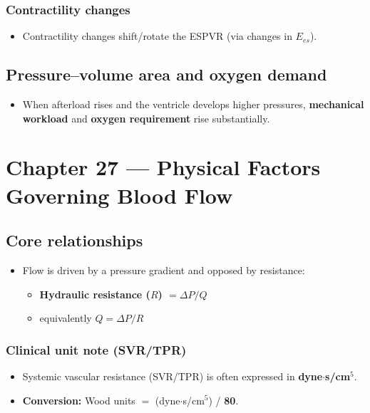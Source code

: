 \documentclass[11pt,a4paper]{article}
\begin{document}
\subsubsection{Contractility changes}
\begin{itemize}
\item Contractility changes shift/rotate the ESPVR (via changes in $E_{es}$).
\end{itemize}

\subsection{Pressure--volume area and oxygen demand}
\begin{itemize}
\item When afterload rises and the ventricle develops higher pressures, \textbf{mechanical workload} and \textbf{oxygen requirement} rise substantially.
\end{itemize}


\section{Chapter 27 --- Physical Factors Governing Blood Flow}

\subsection{Core relationships}
\begin{itemize}
\item Flow is driven by a pressure gradient and opposed by resistance:
  \begin{itemize}
  \item \textbf{Hydraulic resistance ($R$) $=\Delta P/Q$}
  \item equivalently \textbf{$Q=\Delta P/R$}
  \end{itemize}
\end{itemize}

\subsubsection{Clinical unit note (SVR/TPR)}
\begin{itemize}
\item Systemic vascular resistance (SVR/TPR) is often expressed in \textbf{dyne$\cdot$s/cm$^5$}.
\item \textbf{Conversion:} Wood units $=$ (dyne$\cdot$s/cm$^5$) / \textbf{80}.
\end{itemize}
\end{document}
